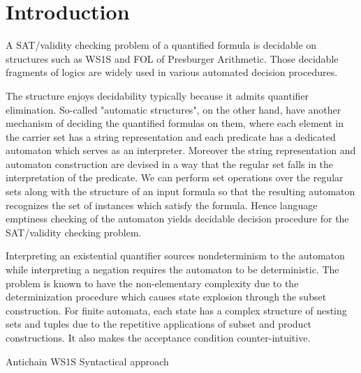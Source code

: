 \section{Introduction}


A SAT/validity checking problem of a quantified formula is decidable on
structures such as WS1S and FOL of Presburger Arithmetic. Those decidable
fragments of logics are widely used in various automated decision
procedures\cite{KlaEtAl:Mona}.

The structure enjoys decidability typically because it admits quantifier
elimination. So-called "automatic structures", on the other hand, have another
mechanism of deciding the quantified formulas on them\cite{}, where each element
in the carrier set has a string representation and each predicate has a
dedicated automaton which serves as an interpreter. Moreover the string
representation and automaton construction are devised in a way that the regular
set falls in the interpretation of the predicate.  We can perform set operations over
the regular sets along with the structure of an input formula so that the
resulting automaton recognizes the set of instances which satisfy the
formula. Hence language emptiness checking of the automaton yields decidable
decision procedure for the SAT/validity checking problem.

   Interpreting an existential quantifier sources nondeterminism to
the automaton while interpreting a negation requires the automaton to be
deterministic. The problem is known to have the non-elementary complexity due to
the determinization procedure which causes state explosion through the subset
construction. For finite automata, each state has a complex structure of nesting
sets and tuples due to the repetitive applications of subset and product
constructions. It also makes the acceptance condition counter-intuitive.

 Antichain WS1S \cite{Fiedor2015,Fiedor2017}
 Syntactical approach\cite{Traytel15,TraytelN15}

